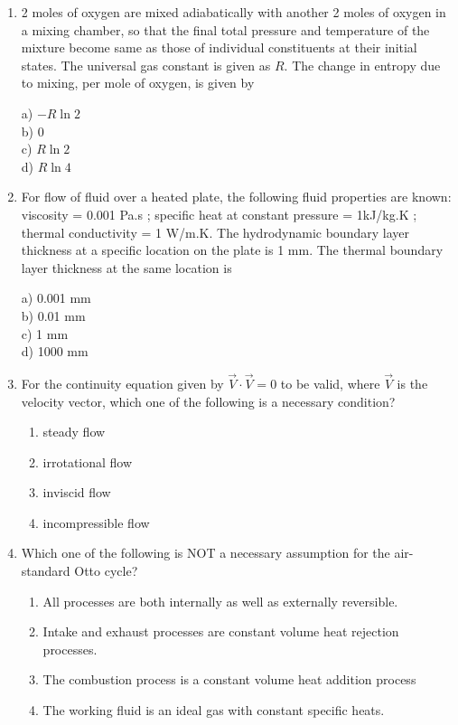 \documentclass[journal]{IEEEtran}
\begin{document}
\begin{enumerate}
\item 2 moles of oxygen are mixed adiabatically with another 2 moles of oxygen in a mixing chamber, so that the final total pressure and temperature of the mixture become same as those of individual constituents at their initial states. The universal gas constant is given as $R$. The change in entropy due to mixing, per mole of oxygen, is given by
\begin{multicols}{4}
     a) $-R\ln{2}$\\
     b) 0\\
     c) $R\ln{2}$\\
     d) $R \ln{4}$
 \end{multicols}
 \item For flow of fluid over a heated plate, the following fluid properties are known:
 viscosity = 0.001 Pa.s ; specific heat at constant pressure = 1kJ/kg.K ; thermal conductivity = 1 W/m.K.
 The hydrodynamic boundary layer thickness at a specific location on the plate is 1 mm. The thermal boundary layer thickness at the same location is
\begin{multicols}{4}
     a) 0.001 mm\\
     b) 0.01 mm\\
     c) 1 mm\\
     d) 1000 mm
 \end{multicols}
\item For the continuity equation given by $\overrightarrow{V}\cdot \overrightarrow{V}=0$ to be valid, where $\overrightarrow{V}
$ is the velocity vector, which one of the following is a necessary condition?
\begin{enumerate}
    \item steady flow
    \item irrotational flow
    \item inviscid flow
    \item incompressible flow
\end{enumerate}
\item Which one of the following is NOT a necessary assumption for the air-standard Otto  cycle?
\begin{enumerate}
    \item All processes are both internally as well as externally reversible.
    \item Intake and exhaust processes are constant volume heat rejection processes.
    \item The combustion process is a constant volume heat addition process
    \item The working fluid is an ideal gas with constant specific heats.

\end{enumerate}
\end{enumerate}
\end{document}
